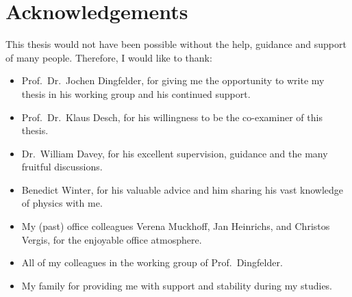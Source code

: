\chapter{Acknowledgements}
\label{sec:ack}

This thesis would not have been possible without the help, guidance and support
of many people. Therefore, I would like to thank:
\begin{itemize}
\item Prof.\ Dr.\ Jochen Dingfelder, for giving me the opportunity to write my
  thesis in his working group and his continued support.

\item Prof.\ Dr.\ Klaus Desch, for his willingness to be the co-examiner of this
  thesis.

\item Dr.\ William Davey, for his excellent supervision, guidance and the many
  fruitful discussions.

\item Benedict Winter, for his valuable advice and him sharing his vast
  knowledge of physics with me.

\item My (past) office colleagues Verena Muckhoff, Jan Heinrichs, and Christos
  Vergis, for the enjoyable office atmosphere.

\item All of my colleagues in the working group of Prof.\ Dingfelder.

\item My family for providing me with support and stability during my studies.

\end{itemize}



